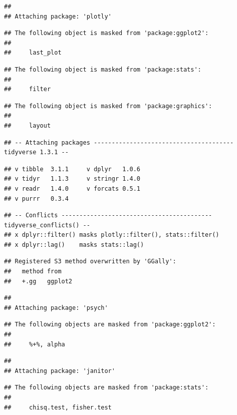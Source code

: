\documentclass[
]{article}
\begin{document}
\begin{verbatim}
## 
## Attaching package: 'plotly'
\end{verbatim}

\begin{verbatim}
## The following object is masked from 'package:ggplot2':
## 
##     last_plot
\end{verbatim}

\begin{verbatim}
## The following object is masked from 'package:stats':
## 
##     filter
\end{verbatim}

\begin{verbatim}
## The following object is masked from 'package:graphics':
## 
##     layout
\end{verbatim}

\begin{verbatim}
## -- Attaching packages --------------------------------------- tidyverse 1.3.1 --
\end{verbatim}

\begin{verbatim}
## v tibble  3.1.1     v dplyr   1.0.6
## v tidyr   1.1.3     v stringr 1.4.0
## v readr   1.4.0     v forcats 0.5.1
## v purrr   0.3.4
\end{verbatim}

\begin{verbatim}
## -- Conflicts ------------------------------------------ tidyverse_conflicts() --
## x dplyr::filter() masks plotly::filter(), stats::filter()
## x dplyr::lag()    masks stats::lag()
\end{verbatim}

\begin{verbatim}
## Registered S3 method overwritten by 'GGally':
##   method from   
##   +.gg   ggplot2
\end{verbatim}

\begin{verbatim}
## 
## Attaching package: 'psych'
\end{verbatim}

\begin{verbatim}
## The following objects are masked from 'package:ggplot2':
## 
##     %+%, alpha
\end{verbatim}

\begin{verbatim}
## 
## Attaching package: 'janitor'
\end{verbatim}

\begin{verbatim}
## The following objects are masked from 'package:stats':
## 
##     chisq.test, fisher.test
\end{verbatim}
\end{document}
